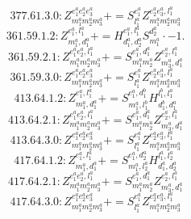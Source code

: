 \documentclass[letterpaper,10pt,fleqn,leqno,onecolumn]{article}
\begin{document}
\begin{equation} \;\;\;\;\;\;  377.61.3.0: Z^{e_{1}^{a}e_{2}^{a}e_{3}^{a}}_{m_{1}^{a}m_{2}^{a}m_{3}^{a}}+=S^{e_{1}^{a}}_{l_{1}^{a}}Z^{e_{2}^{a}e_{3}^{a},l_{1}^{a}}_{m_{1}^{a}m_{2}^{a}m_{3}^{a}} \end{equation}
\begin{equation} \;\;\;\;\;\;  361.59.1.2: Z^{e_{1}^{a},l_{1}^{a}}_{m_{1}^{a},d_{1}^{a}}+=H^{e_{1}^{a},l_{1}^{a}}_{d_{1}^{a},d_{2}^{a}}S^{d_{2}^{a}}_{m_{1}^{a}}\cdot -1. \end{equation}
\begin{equation} \;\;\;\;\;\;  361.59.2.1: Z^{e_{1}^{a}e_{2}^{a},l_{1}^{a}}_{m_{1}^{a}m_{2}^{a}m_{3}^{a}}+=S^{e_{1}^{a},d_{1}^{a}}_{m_{1}^{a}m_{2}^{a}}Z^{e_{2}^{a},l_{1}^{a}}_{m_{3}^{a},d_{1}^{a}} \end{equation}
\begin{equation} \;\;\;\;\;\;  361.59.3.0: Z^{e_{1}^{a}e_{2}^{a}e_{3}^{a}}_{m_{1}^{a}m_{2}^{a}m_{3}^{a}}+=S^{e_{1}^{a}}_{l_{1}^{a}}Z^{e_{2}^{a}e_{3}^{a},l_{1}^{a}}_{m_{1}^{a}m_{2}^{a}m_{3}^{a}} \end{equation}
\begin{equation} \;\;\;\;\;\;  413.64.1.2: Z^{e_{1}^{a},l_{1}^{a}}_{m_{1}^{a},d_{1}^{a}}+=S^{e_{1}^{a},d_{1}^{b}}_{m_{1}^{a},l_{1}^{b}}H^{l_{1}^{b},l_{1}^{a}}_{d_{1}^{b},d_{1}^{a}} \end{equation}
\begin{equation} \;\;\;\;\;\;  413.64.2.1: Z^{e_{1}^{a}e_{2}^{a},l_{1}^{a}}_{m_{1}^{a}m_{2}^{a}m_{3}^{a}}+=S^{e_{1}^{a},d_{1}^{a}}_{m_{1}^{a}m_{2}^{a}}Z^{e_{2}^{a},l_{1}^{a}}_{m_{3}^{a},d_{1}^{a}} \end{equation}
\begin{equation} \;\;\;\;\;\;  413.64.3.0: Z^{e_{1}^{a}e_{2}^{a}e_{3}^{a}}_{m_{1}^{a}m_{2}^{a}m_{3}^{a}}+=S^{e_{1}^{a}}_{l_{1}^{a}}Z^{e_{2}^{a}e_{3}^{a},l_{1}^{a}}_{m_{1}^{a}m_{2}^{a}m_{3}^{a}} \end{equation}
\begin{equation} \;\;\;\;\;\;  417.64.1.2: Z^{e_{1}^{a},l_{1}^{a}}_{m_{1}^{a},d_{1}^{a}}+=S^{e_{1}^{a},d_{2}^{a}}_{m_{1}^{a},l_{2}^{a}}H^{l_{1}^{a},l_{2}^{a}}_{d_{1}^{a},d_{2}^{a}} \end{equation}
\begin{equation} \;\;\;\;\;\;  417.64.2.1: Z^{e_{1}^{a}e_{2}^{a},l_{1}^{a}}_{m_{1}^{a}m_{2}^{a}m_{3}^{a}}+=S^{e_{1}^{a},d_{1}^{a}}_{m_{1}^{a}m_{2}^{a}}Z^{e_{2}^{a},l_{1}^{a}}_{m_{3}^{a},d_{1}^{a}} \end{equation}
\begin{equation} \;\;\;\;\;\;  417.64.3.0: Z^{e_{1}^{a}e_{2}^{a}e_{3}^{a}}_{m_{1}^{a}m_{2}^{a}m_{3}^{a}}+=S^{e_{1}^{a}}_{l_{1}^{a}}Z^{e_{2}^{a}e_{3}^{a},l_{1}^{a}}_{m_{1}^{a}m_{2}^{a}m_{3}^{a}} \end{equation}
\end{document}
